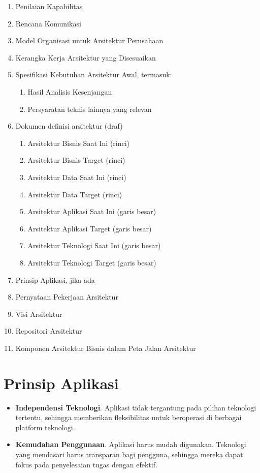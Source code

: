 \begin{enumerate}
	\item Penilaian Kapabilitas
	\item Rencana Komunikasi
	\item Model Organisasi untuk Arsitektur Perusahaan
	\item Kerangka Kerja Arsitektur yang Disesuaikan
	\item Spesifikasi Kebutuhan Arsitektur Awal, termasuk:
	\begin{enumerate}
		\item Hasil Analisis Kesenjangan
		\item Persyaratan teknis lainnya yang relevan
	\end{enumerate}
	\item Dokumen definisi arsitektur (draf)
	\begin{enumerate}
		
	\item Arsitektur Bisnis Saat Ini (rinci)
	\item Arsitektur Bisnis Target (rinci)
	\item Arsitektur Data Saat Ini (rinci)
	\item Arsitektur Data Target (rinci)
	\item Arsitektur Aplikasi Saat Ini (garis besar)
	\item Arsitektur Aplikasi Target (garis besar)
	\item Arsitektur Teknologi Saat Ini (garis besar)
	\item Arsitektur Teknologi Target (garis besar)
\end{enumerate}

	\item Prinsip Aplikasi, jika ada
	\item Pernyataan Pekerjaan Arsitektur
	\item Visi Arsitektur
	\item Repositori Arsitektur
	\item Komponen Arsitektur Bisnis dalam Peta Jalan Arsitektur
\end{enumerate}

\section{Prinsip Aplikasi}
\begin{itemize}
	\item \textbf{Independensi Teknologi}.
	Aplikasi tidak tergantung pada pilihan teknologi tertentu, sehingga memberikan fleksibilitas untuk beroperasi di berbagai platform teknologi.
	
	\item \textbf{Kemudahan Penggunaan}.
	Aplikasi harus mudah digunakan. Teknologi yang mendasari harus transparan bagi pengguna, sehingga mereka dapat fokus pada penyelesaian tugas dengan efektif.
\end{itemize}

